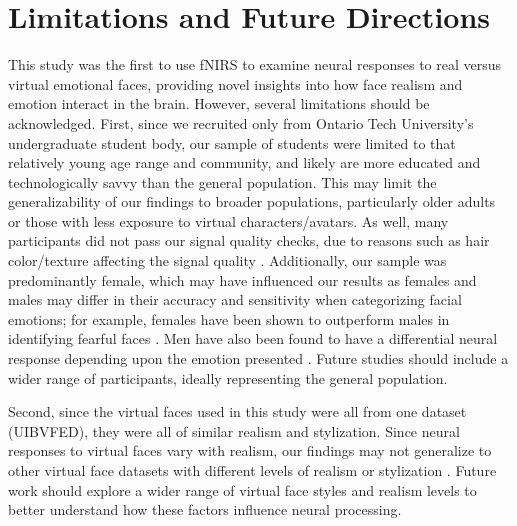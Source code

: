 \section{Limitations and Future Directions}
This study was the first to use fNIRS to examine neural responses to real versus virtual emotional faces, providing novel insights into how face realism and emotion interact in the brain.
However, several limitations should be acknowledged.
First, since we recruited only from Ontario Tech University's undergraduate student body, our sample of students were limited to that relatively young age range and community, and likely are more educated and technologically savvy than the general population.
This may limit the generalizability of our findings to broader populations, particularly older adults or those with less exposure to virtual characters/avatars.
As well, many participants did not pass our signal quality checks, due to reasons such as hair color/texture affecting the signal quality \citep{holmes_opening_2024}. 
Additionally, our sample was predominantly female, which may have influenced our results as females and males may differ in their accuracy and sensitivity when categorizing facial emotions; for example, females have been shown to outperform males in identifying fearful faces \citep{weisenbach_reduced_2014}.
Men have also been found to have a differential neural response depending upon the emotion presented \citep{keslerwest_neural_2001}. 
Future studies should include a wider range of participants, ideally representing the general population. 

Second, since the virtual faces used in this study were all from one dataset (UIBVFED), they were all of similar realism and stylization.
Since neural responses to virtual faces vary with realism, our findings may not generalize to other virtual face datasets with different levels of realism or stylization \citep{schindler_differential_2017}. 
Future work should explore a wider range of virtual face styles and realism levels to better understand how these factors influence neural processing.

